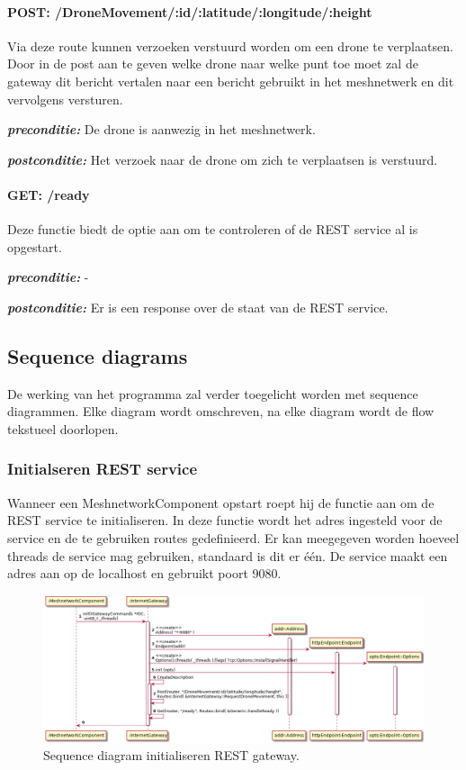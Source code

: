 \documentclass[a4paper, 11pt, oneside]{report}
\begin{document}
\paragraph{POST: /DroneMovement/:id/:latitude/:longitude/:height}
Via deze route kunnen verzoeken verstuurd worden om een drone te verplaatsen.
Door in de post aan te geven welke drone naar welke punt toe moet zal de gateway dit bericht vertalen naar een bericht gebruikt in het meshnetwerk en dit vervolgens versturen.

\textbf{\textit{preconditie:}} De drone is aanwezig in het meshnetwerk.

\textbf{\textit{postconditie:}} Het verzoek naar de drone om zich te verplaatsen is verstuurd.


\paragraph{GET: /ready}
Deze functie biedt de optie aan om te controleren of de REST service al is opgestart.

\textbf{\textit{preconditie:}} -

\textbf{\textit{postconditie:}} Er is een response over de staat van de REST service.

\subsection{Sequence diagrams}
\label{DetailedDesign:RESTgateway:sequence}

De werking van het programma zal verder toegelicht worden met sequence diagrammen.
Elke diagram wordt omschreven, na elke diagram wordt de flow tekstueel doorlopen.

\subsubsection{Initialseren REST service}
Wanneer een MeshnetworkComponent opstart roept hij de functie aan om de REST service te initialiseren. 
In deze functie wordt het adres ingesteld voor de service en de te gebruiken routes gedefinieerd.
Er kan meegegeven worden hoeveel threads de service mag gebruiken, standaard is dit er één.
De service maakt een adres aan op de localhost en gebruikt poort 9080.

\begin{figure}[H]
	\begin{center}\includegraphics[width=1\linewidth]{UML/out/REST/sequence/init/init.png}\end{center}
	\caption{Sequence diagram initialiseren REST gateway.}
	\label{fig:component:RESTgateway:init}
\end{figure}
\end{document}
